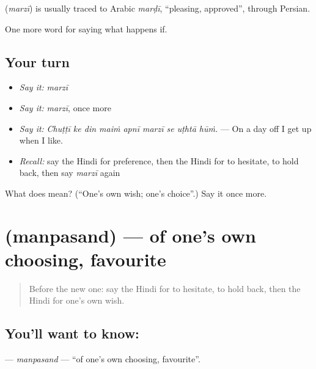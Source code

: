 \begin{cousinweb}
\textbf{} (\emph{marzī}) is usually traced to Arabic \emph{marḍī}, \textquotedblleft{}pleasing, approved\textquotedblright{}, through Persian.
\end{cousinweb}

\begin{grammarlens}[title={What you've built}]
One more word for saying what happens if.
\end{grammarlens}

\subsection*{Your turn}
\begin{itemize}
\raggedright
  \item \emph{Say it:} \emph{marzī}
  \item \emph{Say it:} \emph{marzī}, once more
  \item \emph{Say it:} \emph{Chuṭṭī ke din maiṁ apnī marzī se uṭhtā hūṁ.} — On a day off I get up when I like.
  \item \emph{Recall:} say the Hindi for preference, then the Hindi for to hesitate, to hold back, then say \emph{marzī} again
\end{itemize}

\begin{tcolorbox}[breakable,colback=teal!4,colframe=teal!35!black,title={Before you move on}]
What does  mean? (\textquotedblleft{}One's own wish; one's choice\textquotedblright{}.) Say it once more.
\end{tcolorbox}
\section[\texorpdfstring{\hi{मनपसंद} (manpasand)}{मनपसंद (manpasand)}]{ (manpasand) — of one's own choosing, favourite}

\label{lesson:HI-C550-manpasand}



\begin{quote}
Before the new one: say the Hindi for to hesitate, to hold back, then the Hindi for one's own wish.
\end{quote}

\subsection*{You'll want to know: }
\textbf{} — \emph{manpasand} — \textquotedblleft{}of one's own choosing, favourite\textquotedblright{}.

